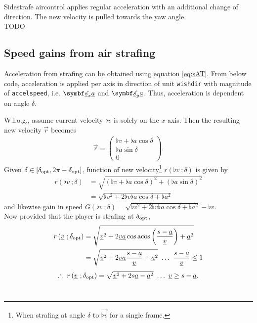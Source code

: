 Sidestrafe aircontrol applies regular acceleration with an additional change of direction. The new velocity is pulled towards the yaw angle.\\
TODO


\subsection{Speed gains from air strafing}
\label{sec:accel_air}
Acceleration from strafing can be obtained using equation \eqref{eq:sAT}.
From below code, acceleration is applied per axis in direction of unit \texttt{wishdir} with magnitude of \texttt{accelspeed}, i.e. $\uvec{\flat{s}_x}\flat{a}$ and $\uvec{\flat{s}_y}\flat{a}$.
Thus, acceleration is dependent on angle $\delta$.

W.l.o.g., assume current velocity $\flat{v}$ is solely on the $x$-axis. Then the resulting new velocity $\vec{r}$ becomes
\begin{align*}
\vec{r} =
\begin{pmatrix}
\flat{v} + \flat{a}\cos\delta\\\flat{a}\sin\delta\\0
\end{pmatrix}.
\end{align*}
Given $\delta \in [\delta_{\operatorname{opt}}, 2\pi - \delta_{\operatorname{opt}}]$, function of new velocity\footnote{When strafing at angle $\delta$ to $\vec{\flat{v}}$ for a single frame.} $r\left(\flat{v}\ ;\delta \right)$ is given by
\begin{align*}
r\left(\flat{v}\ ;\delta \right) &= \sqrt{\left(\flat{v} + \flat{a}\cos\delta \right)^2 + \left(\flat{a}\sin\delta \right)^2}\\
&= \sqrt{\flat{v}^2 + 2\flat{v}\flat{a}\cos\delta + \flat{a}^2}
\end{align*}
and likewise gain in speed $G\left(\flat{v}\ ;\delta \right) = \sqrt{\flat{v}^2 + 2\flat{v}\flat{a}\cos\delta + \flat{a}^2} - \flat{v}$.\\

Now provided that the player is strafing at $\delta_{\operatorname{opt}}$,
\begin{align*}
r\left(\flat{v}\ ;\delta_{\opt} \right) &= \sqrt{\flat{v}^2 + 2\flat{v}\flat{a}\cos{\acos\left( \frac{s - \flat{a}}{\flat{v}} \right)} + \flat{a}^2}\\
&= \sqrt{\flat{v}^2 + 2\flat{v}\flat{a}\frac{s - \flat{a}}{\flat{v}} + \flat{a}^2}\ \ldots\ \frac{s - \flat{a}}{\flat{v}}\le 1
\end{align*}
\begin{align}
\label{eq:accel_opt_air}
\therefore\ r\left(\flat{v}\ ;\delta_{\opt} \right) = \sqrt{\flat{v}^2 + 2s\flat{a} - \flat{a}^2}\ \ldots\ \flat{v}\ge s - \flat{a}.
\end{align}\\


